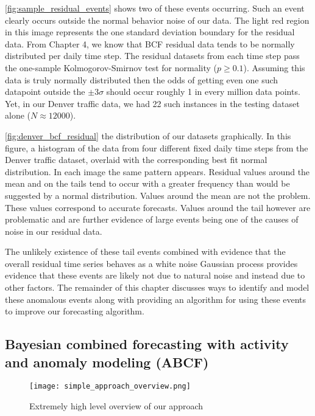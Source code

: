 \ref{fig:sample_residual_events} shows two of these events occurring.  Such an event clearly occurs outside the normal behavior noise of our data.  The light red region in this image represents the one standard deviation boundary for the residual data.  From Chapter 4, we know that BCF residual data tends to be normally distributed per daily time step.  The residual datasets from each time step pass the one-sample Kolmogorov-Smirnov \cite{Marsaglia2003, Lopes2007} test for normality ($p \ge 0.1$).  Assuming this data is truly normally distributed then the odds of getting even one such datapoint outside the $\pm 3 \sigma$ should occur roughly 1 in every million data points.  Yet, in our Denver traffic data, we had 22 such instances in the testing dataset alone ($N \approx 12000$).  

\ref{fig:denver_bcf_residual} the distribution of our datasets graphically.  In this figure, a histogram of the data from four different fixed daily time steps from the Denver traffic dataset, overlaid with the corresponding best fit normal distribution.  In each image the same pattern appears.  Residual values around the mean and on the tails tend to occur with a greater frequency than would be suggested by a normal distribution.  Values around the mean are not the problem.  These values correspond to accurate forecasts.  Values around the tail however are problematic and are further evidence of large events being one of the causes of noise in our residual data.

The unlikely existence of these tail events combined with evidence that the overall residual time series behaves as a white noise Gaussian process provides evidence that these events are likely not due to natural noise and instead due to other factors.  The remainder of this chapter discusses ways to identify and model these anomalous events along with providing an algorithm for using these events to improve our forecasting algorithm.


\subsection{Bayesian combined forecasting with activity and anomaly modeling (ABCF)}

\begin{wrapfigure}{L}{0.3\textwidth}
\centering
\texttt{[image: simple\_approach\_overview.png]}
\caption{Extremely high level overview of our approach}
\label{fig:highlevel_overview}
\end{wrapfigure}

